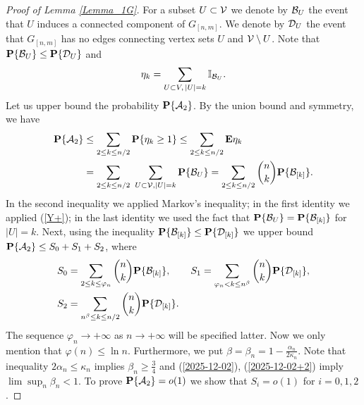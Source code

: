 \documentclass[11pt, a4paper]{article}
\newcommand{\E}{{\bf{E}}}
\newcommand{\PP}{{\bf{P}}}
\begin{document}
 
 \begin{proof}[Proof of Lemma \ref{Lemma_1G}]
 For a subset $U\subset {\cal V}$ we denote by ${\cal B}_U$ the event that
$U$ induces a  connected component of 
$G_{[n,m]}$. 
We denote by ${\cal D}_U$  the event that
$G_{[n,m]}$ has no edges connecting vertex sets $U$ and 
${\cal V}\setminus U$. 
Note that 
$\PP\{{\cal B}_U\}\le \PP\{{\cal D}_U\}$
 and  
\begin{equation}
\label{Y+}
\eta_k=\sum_{U\subset V,\, |U|=k}{\mathbb I}_{{\cal B}_U}.
\end{equation}
Let us upper bound the probability 
$ \PP\{{\cal A}_2\}$.
By the union bound and symmetry, we have
 \begin{align*}
 \PP\{{\cal A}_2\}
 &
 \le 
 \sum_{2\le k\le n/2}\PP\{\eta_k\ge 1\}
 \le
 \sum_{2\le k\le n/2}
 \E \eta_k
 \\
 &
 =
 \sum_{2\le k\le n/2}
 \
 \sum_{U\subset {\cal V}, |U|=k}\PP\{{\cal B}_U\}
 =
 \sum_{2\le k\le n/2}\binom{n}{k}\PP\{{\cal B}_{[k]}\}.
 \end{align*}
 In the second inequality we applied Markov's inequality;
 in the first identity we applied (\ref{Y+});
 in the last identity we used the fact that 
 $\PP\{{\cal B}_U\}=\PP\{{\cal B}_{[k]}\}$ for 
 $|U|=k$.
 Next, using the inequality 
 $\PP\{{\cal B}_{[k]}\}
 \le
  \PP\{{\cal D}_{[k]}\}$ 
  we upper bound
 $\PP\{{\cal A}_2\}\le S_0+S_1+S_2$, 
 where 
 \begin{align}
 \label{2024-03-18+1}
 &
 S_0=\sum_{2\le k\le \varphi_n}
 \binom{n}{k}
 \PP\{{\cal B}_{[k]}\},
\qquad
 S_1=\sum_{\varphi_n< k\le n^{\beta}}
 \binom{n}{k}\PP\{{\cal D}_{[k]}\},
 \\
 \nonumber
 &
 S_2=\sum_{n^{\beta}\le k\le n/2}
 \binom{n}{k}\PP\{{\cal D}_{[k]}\}.
  \end{align}
The sequence $\varphi_n\to+\infty$  as 
$n\to+\infty$ 
will be specified latter.  Now we only mention that 
$\varphi(n)\le \ln n$.
Furthermore, we put 
$\beta
=
\beta_n
 =
 1-\frac{\alpha_n}{2\kappa_n}$. 
 Note that inequality 
 $2\alpha_n\le \kappa_n$ implies 
 $\beta_n\ge \frac{3}{4}$ 
 and (\ref{2025-12-02}), (\ref{2025-12-02+2}) imply  
 $\lim\sup_{n}\beta_n<1$.
 To prove   $\PP\{{\cal A}_2\}=o(1)$ we
 show that
 $S_i=o(1)$ for $i=0,1,2$.

\bigskip


\end{proof}
\end{document}
